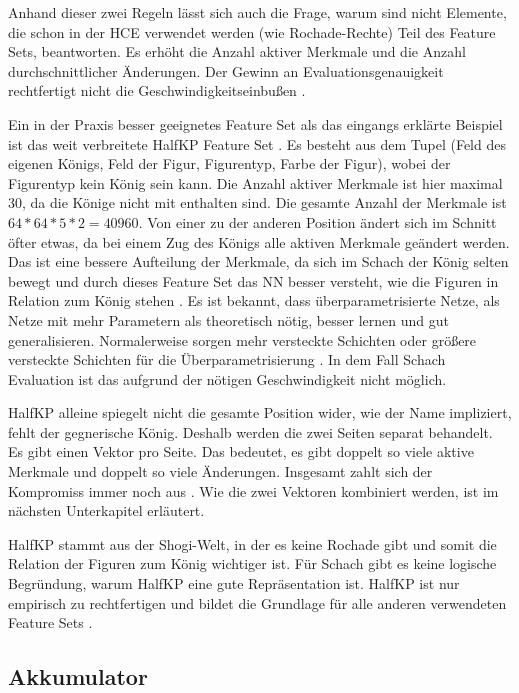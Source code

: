 Anhand dieser zwei Regeln lässt sich auch die Frage, warum sind nicht Elemente, die schon in der \ac{HCE} verwendet werden (wie \zb{} Rochade-Rechte) Teil des Feature Sets, beantworten. Es erhöht die Anzahl aktiver Merkmale und die Anzahl durchschnittlicher Änderungen. Der Gewinn an Evaluationsgenauigkeit rechtfertigt nicht die Geschwindigkeitseinbußen \cite{StockfishNNUE}.

Ein in der Praxis besser geeignetes Feature Set als das eingangs erklärte Beispiel ist das weit verbreitete HalfKP Feature Set \cite{YNasu2018,StockfishNNUE}. Es besteht aus dem Tupel (Feld des eigenen Königs, Feld der Figur, Figurentyp, Farbe der Figur), wobei der Figurentyp kein König sein kann. Die Anzahl aktiver Merkmale ist hier maximal 30, da die Könige nicht mit enthalten sind. Die gesamte Anzahl der Merkmale ist $64*64*5*2=40960$. Von einer zu der anderen Position ändert sich im Schnitt öfter etwas, da bei einem Zug des Königs alle aktiven Merkmale geändert werden. Das ist eine bessere Aufteilung der Merkmale, da sich im Schach der König selten bewegt und durch dieses Feature Set das \ac{NN} besser versteht, wie die Figuren in Relation zum König stehen \cite{StockfishNNUE}. Es ist bekannt, dass überparametrisierte Netze, als Netze mit mehr Parametern als theoretisch nötig, besser lernen und gut generalisieren. Normalerweise sorgen mehr versteckte Schichten oder größere versteckte Schichten für die Überparametrisierung \cite{Du2018, allen2019learning}. In dem Fall Schach Evaluation ist das aufgrund der nötigen Geschwindigkeit nicht möglich.

HalfKP alleine spiegelt nicht die gesamte Position wider, wie der Name impliziert, fehlt der gegnerische König. Deshalb werden die zwei Seiten separat behandelt. Es gibt einen Vektor pro Seite. Das bedeutet, es gibt doppelt so viele aktive Merkmale und doppelt so viele Änderungen. Insgesamt zahlt sich der Kompromiss immer noch aus \cite{StockfishNNUE}. Wie die zwei Vektoren kombiniert werden, ist im nächsten Unterkapitel erläutert.

HalfKP stammt aus der Shogi-Welt, in der es keine Rochade gibt und somit die Relation der Figuren zum König wichtiger ist. Für Schach gibt es keine logische Begründung, warum HalfKP eine gute Repräsentation ist. HalfKP ist nur empirisch zu rechtfertigen und bildet die Grundlage für alle anderen verwendeten Feature Sets \cite{StockfishNNUE}.

\subsection{Akkumulator}
\label{chap:accumulator}

